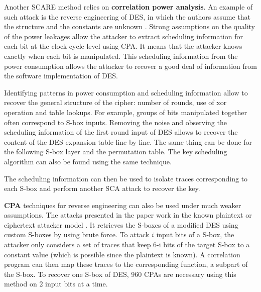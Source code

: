 \documentclass[11pt]{sdm}
\begin{document}
\smallbreak
Another SCARE method relies on \textbf{correlation power analysis}.
An example of such attack is the reverse engineering of DES, in which the authors assume that the structure and the constants are unknown \parencite{Daudigny_Ledig_Muller_Valette_2005}.
Strong assumptions on the quality of the power leakages allow the attacker to extract scheduling information for each bit at the clock cycle level using CPA.
It means that the attacker knows exactly when each bit is manipulated.
This scheduling information from the power consumption allows the attacker to recover a good deal of information from the software implementation of DES.

Identifying patterns in power consumption and scheduling information allow to recover the general structure of the cipher: number of rounds, use of xor operation and table lookups.
For example, groups of bits manipulated together often correspond to S-box inputs.
Removing the noise and observing the scheduling information of the first round input of DES allows to recover the content of the DES expansion table line by line.
The same thing can be done for the following S-box layer and the permutation table.
The key scheduling algorithm can also be found using the same technique.

The scheduling information can then be used to isolate traces corresponding to each S-box and perform another SCA attack to recover the key.

\smallbreak
\textbf{CPA} techniques for reverse engineering can also be used under much weaker assumptions.
The attacks presented in the paper work in the known plaintext or ciphertext attacker model \parencite{Guilley_Sauvage_Micolod_Réal_Valette_2010}.
It retrieves the S-boxes of a modified DES using custom S-boxes by using brute force.
To attack $i$ input bits of a S-box, the attacker only considers a set of traces that keep 6-i bits of the target S-box to a constant value (which is possible since the plaintext is known).
A correlation program can then map these traces to the corresponding function, a subpart of the S-box.
To recover one S-box of DES, 960 CPAs are necessary using this method on 2 input bits at a time.



\end{document}
